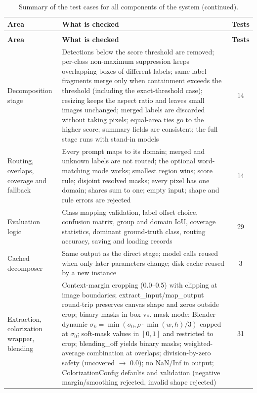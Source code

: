 \documentclass{FastFyp}
\begin{document}
 
\begin{longtable}{|p{3.4cm}|p{6.8cm}|c|}
\caption{Summary of the test cases for all components of the system.}
\label{tab:a_test_summary} \\
\hline
\textbf{Area} & \textbf{What is checked} & \textbf{Tests} \\ \hline
\endfirsthead
\caption[]{Summary of the test cases for all components of the system (continued).} \\
\hline
\textbf{Area} & \textbf{What is checked} & \textbf{Tests} \\ \hline
\endhead
\hline
\endfoot
\hline
\endlastfoot
Decomposition stage & Detections below the score threshold are removed; per-class non-maximum suppression keeps overlapping boxes of different labels; same-label fragments merge only when containment exceeds the threshold (including the exact-threshold case); resizing keeps the aspect ratio and leaves small images unchanged; merged labels are discarded without taking pixels; equal-area ties go to the higher score; summary fields are consistent; the full stage runs with stand-in models & 14 \\ \hline
Routing, overlaps, coverage and fallback & Every prompt maps to its domain; merged and unknown labels are not routed; the optional word-matching mode works; smallest region wins; score rule; disjoint resolved masks; every pixel has one domain; shares sum to one; empty input; shape and rule errors are rejected & 14 \\ \hline
Evaluation logic & Class mapping validation, label offset choice, confusion matrix, group and domain IoU, coverage statistics, dominant ground-truth class, routing accuracy, saving and loading records & 29 \\ \hline
Cached decomposer & Same output as the direct stage; model calls reused when only later parameters change; disk cache reused by a new instance & 3 \\ \hline
Extraction, colorization wrapper, blending & Context-margin cropping (0.0--0.5) with clipping at image boundaries; extract\_input/map\_output round-trip preserves canvas shape and zeros outside crop; binary masks in box vs. mask mode; Blender dynamic $\sigma_k = \min(\sigma_0, \rho \cdot \min(w,h)/3)$ capped at $\sigma_0$; soft-mask values in $[0,1]$ and restricted to crop; blending\_off yields binary masks; weighted-average combination at overlaps; division-by-zero safety (uncovered $\to$ 0.0); no NaN/Inf in output; ColorizationConfig defaults and validation (negative margin/smoothing rejected, invalid shape rejected) & 31 \\ \hline

\end{longtable}
\end{document}
